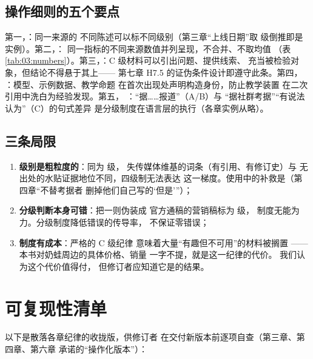 \subsection{操作细则的五个要点}

第一，：同一来源的
不同陈述可以标不同级别（第三章“上线日期”取
 级倒推即是实例）。第二，：
同一指标的不同来源数值并列呈现，不合并、不取均值
（表 \ref{tab:03:numbers}）。第三，：C 级材料可以引出问题、提供线索、
充当被检验对象，但结论不得悬于其上——
第七章 H7.5 的证伪条件设计即遵守此条。第四，
：模型、示例数据、教学命题
在首次出现处声明构造身份，防止教学装置
在二次引用中洗白为经验发现。第五，
：“据……报道”（A/B）与
“据社群考据”“有说法认为”（C）的句式差异
是分级制度在语言层的执行（各章实例从略）。

\subsection{三条局限}

\begin{enumerate}[label=\arabic*.]
  \item \textbf{级别是粗粒度的}：同为  级，
        失传媒体维基的词条（有引用、有修订史）与
        无出处的水贴证据地位不同，四级制无法表达
        这一梯度。使用中的补救是（第四章“不替考据者
        删掉他们自己写的‘但是’”）；
  \item \textbf{分级判断本身可错}：把一则伪装成
        官方通稿的营销稿标为  级，
        制度无能为力。分级制度降低错误的传导率，
        不保证零错误；
  \item \textbf{制度有成本}：严格的 C 级纪律
        意味着大量“有趣但不可用”的材料被搁置
        ——本书对奶蛙周边的具体价格、销量
        一字不提，就是这一纪律的代价。
        我们认为这个代价值得付，
        但修订者应知道它是的结果。
\end{enumerate}

\section{可复现性清单}\label{sec:12:checklist}

以下是散落各章纪律的收拢版，供修订者
在交付新版本前逐项自查（第三章、第四章、第六章
承诺的“操作化版本”）：

